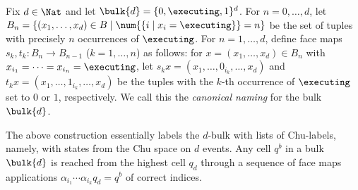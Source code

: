     \begin{definition}
    \label{def:canonical-naming}
        
        Fix $d\in \Nat$ and let $\bulk{d}= \{ 0, \executing, 1\}^d$. For $n= 0,\dotsc, d$, let $B_n=\{( x_1,\dotsc, x_d)\in B\mid \num{\{ i\mid x_i= \executing\}}= n\}$ be the set of tuples with precisely $n$ occurrences of $\executing$.  For $n= 1,\dotsc, d$, define face maps $s_k, t_k: B_n\to B_{ n- 1}$ ($k= 1,\dotsc, n$) as follows: for $x=( x_1,\dotsc, x_d)\in B_n$ with $x_{ i_1}=\dotsm= x_{ i_n}= \executing$, let $s_k x=( x_1,\dotsc, 0_{ i_k},\dotsc, x_d)$ and $t_k x=( x_1,\dotsc, 1_{ i_k},\dotsc, x_d)$ be the tuples with the $k$-th occurrence of $\executing$ set to $0$ or $1$, respectively. We call this the \emph{canonical naming} for the bulk $\bulk{d}$.
    \end{definition}



    The above construction essentially labels the $d$-bulk with lists of Chu-labels, namely, with states from the Chu space on $d$ events. Any cell $q^{b}$ in a bulk $\bulk{d}$ is reached from the highest cell $q_{d}$ through a sequence of face maps applications $\alpha_{i_{1}}\dotsm \alpha_{i_{k}}q_{d}=q^{b}$ of correct indices. 
    
  
  

